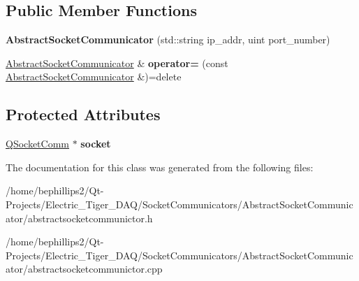 \subsection*{Public Member Functions}
\begin{DoxyCompactItemize}
\item 
{\bfseries Abstract\+Socket\+Communicator} (std\+::string ip\+\_\+addr, uint port\+\_\+number)\hypertarget{class_abstract_socket_communicator_a94b6e0b544fadba42bd3a5c6f4a549fd}{}\label{class_abstract_socket_communicator_a94b6e0b544fadba42bd3a5c6f4a549fd}

\item 
\hyperlink{class_abstract_socket_communicator}{Abstract\+Socket\+Communicator} \& {\bfseries operator=} (const \hyperlink{class_abstract_socket_communicator}{Abstract\+Socket\+Communicator} \&)=delete\hypertarget{class_abstract_socket_communicator_a7ee57a3af5927ac08f515055dbcdc829}{}\label{class_abstract_socket_communicator_a7ee57a3af5927ac08f515055dbcdc829}

\end{DoxyCompactItemize}
\subsection*{Protected Attributes}
\begin{DoxyCompactItemize}
\item 
\hyperlink{class_q_socket_comm}{Q\+Socket\+Comm} $\ast$ {\bfseries socket}\hypertarget{class_abstract_socket_communicator_a7e69037572c26cf596bd117490f9d6c1}{}\label{class_abstract_socket_communicator_a7e69037572c26cf596bd117490f9d6c1}

\end{DoxyCompactItemize}


The documentation for this class was generated from the following files\+:\begin{DoxyCompactItemize}
\item 
/home/bephillips2/\+Qt-\/\+Projects/\+Electric\+\_\+\+Tiger\+\_\+\+D\+A\+Q/\+Socket\+Communicators/\+Abstract\+Socket\+Communicator/abstractsocketcommunictor.\+h\item 
/home/bephillips2/\+Qt-\/\+Projects/\+Electric\+\_\+\+Tiger\+\_\+\+D\+A\+Q/\+Socket\+Communicators/\+Abstract\+Socket\+Communicator/abstractsocketcommunictor.\+cpp\end{DoxyCompactItemize}
